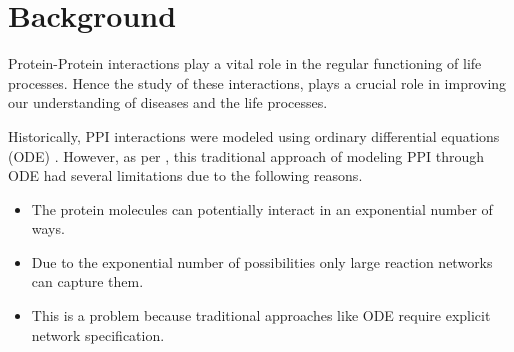 \documentclass[msc,deptreport,ai]{infthesis}      %
\begin{document}







\chapter{Background}
Protein-Protein interactions play a vital role in the regular functioning of life processes. Hence the study of these interactions, plays a crucial role in improving our understanding of diseases and the life processes.

Historically, PPI interactions were modeled using ordinary differential equations (ODE) \cite{ode}. However, as per \cite{rule-based-general}, this traditional approach of modeling PPI through ODE had several limitations due to the following reasons.

\begin{itemize}
	\item
	The protein molecules can potentially interact in an exponential number of ways. 
	\item
	Due to the exponential number of possibilities only large reaction networks can capture them.
	\item
	This is a problem because traditional approaches like ODE require explicit network specification.
\end{itemize}
\end{document}
